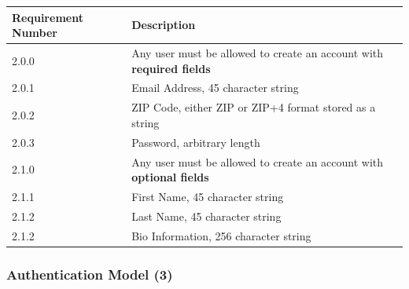 \documentclass[12pt]{article}
\begin{document}
\setlength{\tabcolsep}{1cm}
\begin{longtable}{|l|p{8cm}|}
    \hline
    Requirement Number & Description                                                            \\

    \hline\hline
    2.0.0              & Any user must be allowed to create an account with \bf required fields \\
    \hline
    2.0.1              & Email Address, 45 character string                                     \\
    \hline
    2.0.2              & ZIP Code, either ZIP or ZIP+4 format stored as a string                \\ \hline
    2.0.3              & Password, arbitrary length                                             \\

    \hline\hline
    2.1.0              & Any user must be allowed to create an account with \bf optional fields \\
    \hline
    2.1.1              & First Name, 45 character string                                        \\
    \hline
    2.1.2              & Last Name, 45 character string                                         \\
    \hline
    2.1.2              & Bio Information, 256 character string                                  \\
    \hline
\end{longtable}

\subsubsection{Authentication Model (3)}
\end{document}
